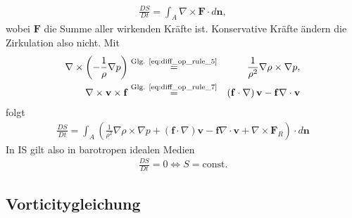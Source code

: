 \documentclass{book}
\newcommand{\md}[1]{\frac{D#1}{Dt}}
\begin{document}
%
\begin{eqnarray}
\md{S} = \int_A\nabla\times\mathbf{F}\cdot d\mathbf{n},
\end{eqnarray}
%
wobei $\mathbf{F}$ die Summe aller wirkenden Kräfte ist. Konservative Kräfte ändern die Zirkulation also nicht. Mit
%
\begin{eqnarray}
\nabla\times\left(-\frac{1}{\rho}\nabla p\right) & \stackrel{\text{Glg. \eqref{eq:diff_op_rule_5}}}{=} & \frac{1}{\rho^2}\nabla\rho\times\nabla p,\\
\nabla\times\mathbf{v}\times\mathbf{f} & \stackrel{\text{Glg. \eqref{eq:diff_op_rule_7}}}{=} & \left(\mathbf{f}\cdot\nabla\right)\mathbf{v} - \mathbf{f}\nabla\cdot\mathbf{v}
\end{eqnarray}
%
folgt
%
\begin{eqnarray}
\md{S} = \int_A\left(\frac{1}{\rho^2}\nabla\rho\times\nabla p + \left(\mathbf{f}\cdot\nabla\right)\mathbf{v} - \mathbf{f}\nabla\cdot\mathbf{v} + \nabla\times\mathbf{F}_R\right)\cdot d\mathbf{n}\label{eq:circ_theorem}
\end{eqnarray}
%
In IS gilt also in barotropen idealen Medien
%
\begin{eqnarray}
\md{S} = 0 \Leftrightarrow S = \text{const.}\label{eq:circ_theorem_mod_1}
\end{eqnarray}

\subsection{Vorticitygleichung}
\label{sec:vorticitygleichung}
\end{document}
